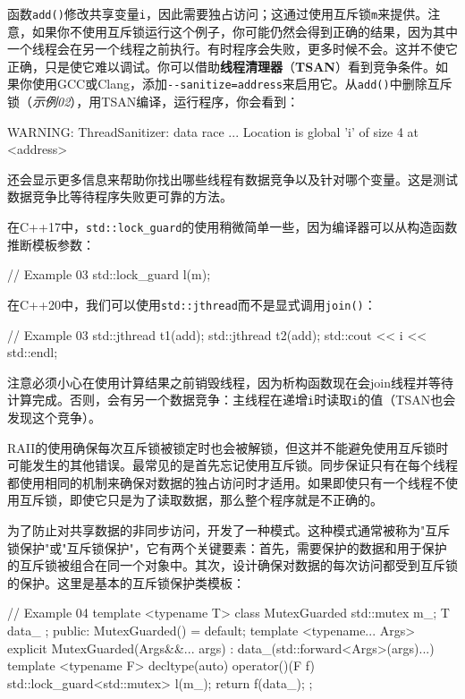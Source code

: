 函数\texttt{add()}修改共享变量\texttt{i}，因此需要独占访问；这通过使用互斥锁\texttt{m}来提供。注意，如果你不使用互斥锁运行这个例子，你可能仍然会得到正确的结果，因为其中一个线程会在另一个线程之前执行。有时程序会失败，更多时候不会。这并不使它正确，只是使它难以调试。你可以借助\textbf{线程清理器}（\textbf{TSAN}）看到竞争条件。如果你使用GCC或Clang，添加\texttt{-\/-sanitize=address}来启用它。从\texttt{add()}中删除互斥锁（\emph{示例02}），用TSAN编译，运行程序，你会看到：

\begin{code}
WARNING: ThreadSanitizer: data race
...
Location is global 'i' of size 4 at <address>
\end{code}

还会显示更多信息来帮助你找出哪些线程有数据竞争以及针对哪个变量。这是测试数据竞争比等待程序失败更可靠的方法。

在C++17中，\texttt{std::lock\_guard}的使用稍微简单一些，因为编译器可以从构造函数推断模板参数：

\begin{code}
// Example 03
std::lock_guard l(m);
\end{code}

在C++20中，我们可以使用\texttt{std::jthread}而不是显式调用\texttt{join()}：

\begin{code}
// Example 03
{
  std::jthread t1(add);
  std::jthread t2(add);
}
std::cout << i << std::endl;
\end{code}

注意必须小心在使用计算结果之前销毁线程，因为析构函数现在会join线程并等待计算完成。否则，会有另一个数据竞争：主线程在递增\texttt{i}时读取\texttt{i}的值（TSAN也会发现这个竞争）。

RAII的使用确保每次互斥锁被锁定时也会被解锁，但这并不能避免使用互斥锁时可能发生的其他错误。最常见的是首先忘记使用互斥锁。同步保证只有在每个线程都使用相同的机制来确保对数据的独占访问时才适用。如果即使只有一个线程不使用互斥锁，即使它只是为了读取数据，那么整个程序就是不正确的。

为了防止对共享数据的非同步访问，开发了一种模式。这种模式通常被称为"互斥锁保护"或"互斥锁保护"，它有两个关键要素：首先，需要保护的数据和用于保护的互斥锁被组合在同一个对象中。其次，设计确保对数据的每次访问都受到互斥锁的保护。这里是基本的互斥锁保护类模板：

\begin{code}
// Example 04
template <typename T> class MutexGuarded {
  std::mutex m_;
  T data_ {};
  public:
  MutexGuarded() = default;
  template <typename... Args>
  explicit MutexGuarded(Args&&... args) :
    data_(std::forward<Args>(args)...) {}
  template <typename F> decltype(auto) operator()(F f) {
    std::lock_guard<std::mutex> l(m_);
    return f(data_);
  }
};
\end{code}

